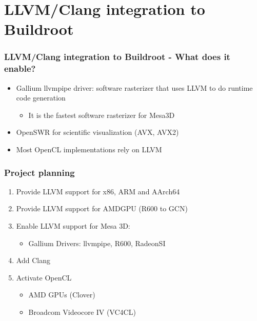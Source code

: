 \documentclass{smilebeamer}
\begin{document}
\section{LLVM/Clang integration to Buildroot}


\begin{frame}
\frametitle{LLVM/Clang integration to Buildroot - What does it enable?}
\begin{itemize}
  \item Gallium llvmpipe driver: software rasterizer that uses LLVM to do runtime code generation
  \begin{itemize}
    \item It is the fastest software rasterizer for Mesa3D
  \end{itemize}
  \item OpenSWR for scientific visualization (AVX, AVX2)
  \item Most OpenCL implementations rely on LLVM
\end{itemize}
\end{frame}



\begin{frame}
\frametitle{Project planning}
\begin{enumerate}
  \item Provide LLVM support for x86, ARM and AArch64
  \item Provide LLVM support for AMDGPU (R600 to GCN)
  \item Enable LLVM support for Mesa 3D:
    \begin{itemize}
      \item Gallium Drivers: llvmpipe, R600, RadeonSI
    \end{itemize}
  \item Add Clang
  \item Activate OpenCL
  \begin{itemize}
    \item AMD GPUs (Clover)
    \item Broadcom Videocore IV (VC4CL)
  \end{itemize}
\end{enumerate}
\end{frame}
\end{document}
